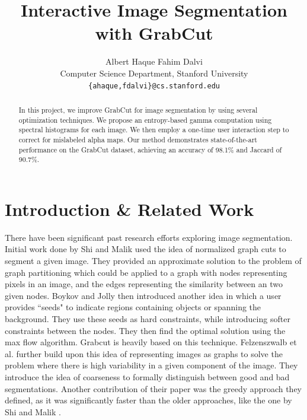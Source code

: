 \documentclass[10pt,twocolumn,letterpaper]{article}
\begin{document}
\title{Interactive Image Segmentation with GrabCut}

\author{Albert Haque \qquad Fahim Dalvi \\
Computer Science Department, Stanford University\\
{\tt\small \{ahaque,fdalvi\}@cs.stanford.edu}
}

\maketitle


\begin{abstract}
   In this project, we improve GrabCut for image segmentation by using several optimization techniques. We propose an entropy-based gamma computation using spectral histograms for each image. We then employ a one-time user interaction step to correct for mislabeled alpha maps. Our method demonstrates state-of-the-art performance on the GrabCut dataset, achieving an accuracy of 98.1\% and Jaccard of 90.7\%.
\end{abstract}

\section{Introduction \& Related Work}\label{sec:related_work}

There have been significant past research efforts exploring image segmentation. Initial work done by Shi and Malik \cite{shimalik97} used the idea of normalized graph cuts to segment a given image. They provided an approximate solution to the problem of graph partitioning which could be applied to a graph with nodes representing pixels in an image, and the edges representing the similarity between an two given nodes. Boykov and Jolly \cite{boykovjolly01} then introduced another idea in which a user provides ``seeds" to indicate regions containing objects or spanning the background. They use these seeds as hard constraints, while introducing softer constraints between the nodes. They then find the optimal solution using the max flow algorithm. Grabcut is heavily based on this technique. Felzenszwalb et al. \cite{felzenszwalb04} further build upon this idea of representing images as graphs to solve the problem where there is high variability in a given component of the image. They introduce the idea of coarseness to formally distinguish between good and bad segmentations. Another contribution of their paper was the greedy approach they defined, as it was significantly faster than the older approaches, like the one by Shi and Malik \cite{shimalik97}.
\end{document}
